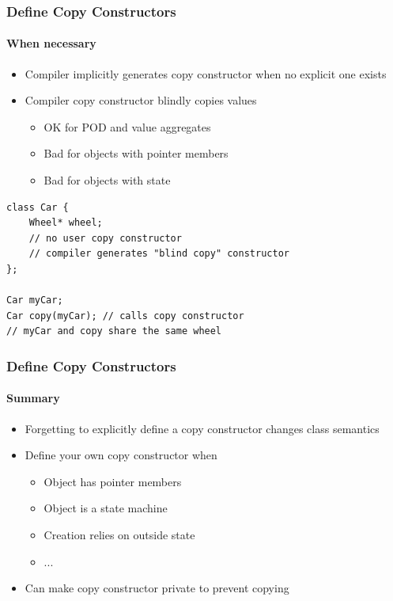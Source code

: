 \documentclass[table]{beamer}
\newcounter{rulecount}
\newcommand{\declarerule}{\textbf{\color{themeblue}{Rule \therulecount:}} }
\begin{document}
\begin{frame}[fragile]
    \frametitle{\declarerule Define Copy Constructors }
    \framesubtitle{When necessary}
    \begin{itemize}
        \item Compiler implicitly generates copy constructor when no explicit one exists
        \item Compiler copy constructor blindly copies values
            \begin{itemize}
                \item OK for POD and value aggregates
                \item Bad for objects with pointer members
                \item Bad for objects with state
            \end{itemize}
    \end{itemize}
    \begin{lstlisting}[title=Copy Constructor]
class Car {
    Wheel* wheel;
    // no user copy constructor
    // compiler generates "blind copy" constructor
};

Car myCar;
Car copy(myCar); // calls copy constructor
// myCar and copy share the same wheel
    \end{lstlisting}
\end{frame}

\begin{frame}[fragile]
    \frametitle{\declarerule Define Copy Constructors }
    \framesubtitle{Summary}
    \begin{itemize}
        \item Forgetting to explicitly define a copy constructor 
            changes class semantics
        \item Define your own copy constructor when
            \begin{itemize}
                \item Object has pointer members
                \item Object is a state machine
                \item Creation relies on outside state
                \item ...
            \end{itemize}
        \item Can make copy constructor private to prevent copying
    \end{itemize}
\end{frame}
\end{document}
